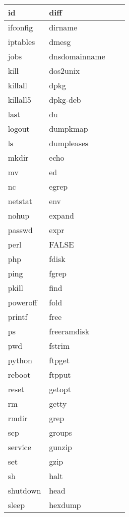 \begin{longtable}{llp{60mm}p{60mm}}
     \hline
     id & diff \\
     \hline
     ifconfig & dirname \\
     \hline
     iptables & dmesg \\
     \hline
     jobs & dnsdomainname \\
     \hline
     kill & dos2unix \\
     \hline
     killall & dpkg \\
     \hline
     killall5 & dpkg-deb \\
     \hline
     last & du \\
     \hline
     logout & dumpkmap \\
     \hline
     ls & dumpleases \\
     \hline
     mkdir & echo \\
     \hline
     mv & ed \\
     \hline
     nc & egrep \\
     \hline
     netstat & env \\
     \hline
     nohup & expand \\
     \hline
     passwd & expr \\
     \hline
     perl & FALSE \\
     \hline
     php & fdisk \\
     \hline
     ping & fgrep \\
     \hline
     pkill & find \\
     \hline
     poweroff & fold \\
     \hline
     printf & free \\
     \hline
     ps & freeramdisk \\
     \hline
     pwd & fstrim \\
     \hline
     python & ftpget \\
     \hline
     reboot & ftpput \\
     \hline
     reset & getopt \\
     \hline
     rm & getty \\
     \hline
     rmdir & grep \\
     \hline
     scp & groups \\
     \hline
     service & gunzip \\
     \hline
     set & gzip \\
     \hline
     sh & halt \\
     \hline
     shutdown & head \\
     \hline
     sleep & hexdump \\

\end{longtable}
